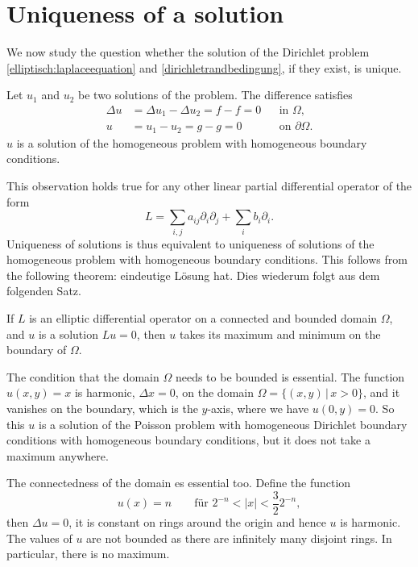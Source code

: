 %
%
%
\section{Uniqueness of a solution}
We now study the question whether the solution of the Dirichlet problem
\eqref{elliptisch:laplaceequation} and \eqref{dirichletrandbedingung},
if they exist, is unique.

Let $u_1$ and $u_2$ be two solutions of the problem.
The difference satisfies
\[
\begin{aligned}
\Delta u&=\Delta u_1-\Delta u_2=f-f=0&&\text{in $\Omega$,}\\
u&=u_1-u_2=g-g=0&&\text{on $\partial\Omega$.}
\end{aligned}
\]
$u$ is a solution of the homogeneous problem with homogeneous 
boundary conditions.

This observation holds true for any other linear partial differential
operator of the form
\[
L=\sum_{i,j}a_{ij}\partial_i\partial_j+\sum_i b_i\partial_i.
\]
Uniqueness of solutions is thus equivalent to uniqueness of solutions
of the homogeneous problem with homogeneous boundary conditions.
This follows from the following theorem:
eindeutige Lösung hat. Dies wiederum folgt aus dem folgenden Satz.

\begin{satz}
\label{maximumprinzip}
If $L$ is an elliptic differential operator on a connected and
bounded domain $\Omega$, and $u$ is a solution $Lu=0$, then $u$ takes
its maximum and minimum on the boundary of $\Omega$.
\end{satz}

The condition that the domain $\Omega$ needs to be bounded is essential.
The function $u(x,y)=x$ is harmonic, $\Delta x=0$, on the domain
$\Omega=\{(x,y)\,|\,x>0\}$, and it vanishes on the boundary, which is
the $y$-axis, where we have $u(0,y)=0$.
So this $u$ is a solution of the Poisson problem with homogeneous
Dirichlet boundary conditions with homogeneous boundary conditions, 
but it does not take a maximum anywhere.

The connectedness of the domain es essential too.
Define the function
\[
u(x)=n\qquad\text{für $2^{-n} < |x| < \frac{3}{2}2^{-n}$},
\]
then $\Delta u=0$, it is constant on rings around the origin and hence
$u$ is harmonic.
The values of $u$ are not bounded as there are infinitely many disjoint
rings.
In particular, there is no maximum.

